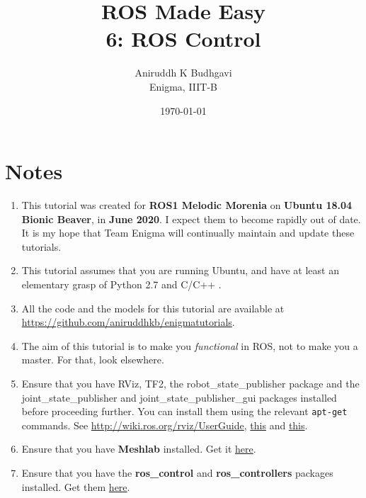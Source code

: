 \documentclass{article}
\title{ROS Made Easy \\6: ROS Control}
\date{\today}
\author{Aniruddh K Budhgavi \\Enigma, IIIT-B}
\begin{document}
    \maketitle
    \section{Notes}
    \begin{enumerate}
        \item This tutorial was created for \textbf{ROS1 Melodic Morenia}
        on \textbf{Ubuntu 18.04 Bionic Beaver}, in \textbf{June 2020}.
        I expect them to become rapidly out of date. It is my hope
        that Team Enigma will continually maintain and update these tutorials.
        \item This tutorial assumes that you are running Ubuntu, and have at least an
        elementary grasp of Python 2.7 and C/C++ .
        \item All the code and the models for this tutorial are available at 
        \url{https://github.com/aniruddhkb/enigmatutorials}.
        \item The aim of this tutorial is to make you \emph{functional} in ROS, not to make you a master. For 
        that, look elsewhere.
        \item Ensure that you have RViz, TF2, the robot\_state\_publisher package and the joint\_state\_publisher
        and joint\_state\_publisher\_gui packages installed before proceeding further. You can install them 
        using the relevant \texttt{apt-get} commands. See \url{http://wiki.ros.org/rviz/UserGuide},
        \href{http://wiki.ros.org/tf2/Tutorials/Introduction%20to%20tf2}{this} and
        \href{https://answers.ros.org/question/346665/how-to-install-joint_state_publisher_gui-in-melodic-version-of-ros/}{this}.

        \item Ensure that you have \textbf{Meshlab} installed. Get it \href{https://snapcraft.io/install/meshlab/ubuntu}{here}.
        
        \item Ensure that you have the \textbf{ros\_control} and \textbf{ros\_controllers} packages installed. Get them \href{http://wiki.ros.org/ros_control#Install}{here}.
    \end{enumerate}
\end{document}
